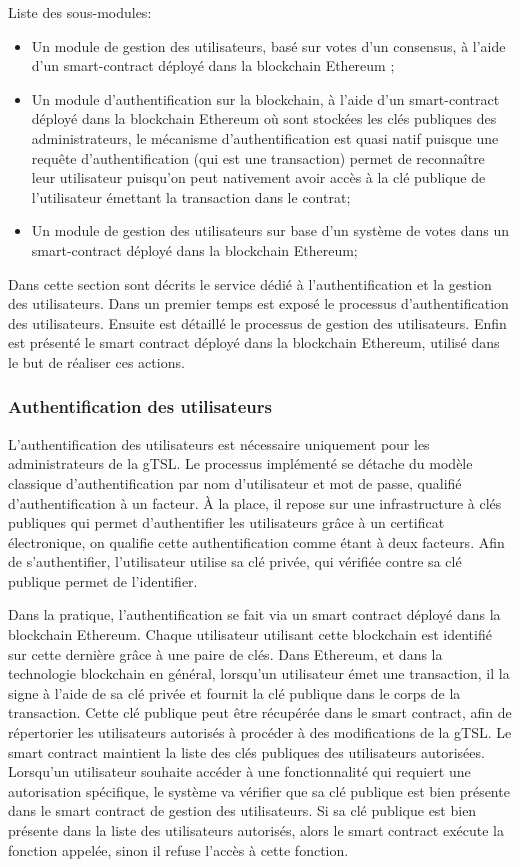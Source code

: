 \documentclass{tnreport}
\begin{document}
Liste des sous-modules:
\begin{itemize}
	\item Un module de gestion des utilisateurs, basé sur votes d’un consensus, à l’aide d’un smart-contract déployé dans la blockchain Ethereum ;
	\item Un module d'authentification sur la blockchain, à l’aide d’un smart-contract déployé dans la blockchain Ethereum où sont stockées les clés publiques des administrateurs, le mécanisme d'authentification est quasi natif puisque une requête d'authentification (qui est une transaction) permet de reconnaître leur utilisateur puisqu'on peut nativement avoir accès à la clé publique de l'utilisateur émettant la transaction dans le contrat;
	\item Un module de gestion des utilisateurs sur base d'un système de votes dans un smart-contract déployé dans la blockchain Ethereum;
\end{itemize}
\fi

Dans cette section sont décrits le service dédié à l'authentification et la gestion des utilisateurs. Dans un premier temps est exposé le processus d'authentification des utilisateurs. Ensuite est détaillé le processus de gestion des utilisateurs. Enfin est présenté le smart contract déployé dans la blockchain Ethereum, utilisé dans le but de réaliser ces actions.

\subsubsection{Authentification des utilisateurs}

L'authentification des utilisateurs est nécessaire uniquement pour les administrateurs de la gTSL. Le processus implémenté se détache du modèle classique d'authentification par nom d'utilisateur et mot de passe, qualifié d'authentification à un facteur. À la place, il repose sur une infrastructure à clés publiques qui permet d'authentifier les utilisateurs grâce à un certificat électronique, on qualifie cette authentification comme étant à deux facteurs. Afin de s'authentifier, l'utilisateur utilise sa clé privée, qui vérifiée contre sa clé publique permet de l'identifier.

Dans la pratique, l'authentification se fait via un smart contract déployé dans la blockchain Ethereum. Chaque utilisateur utilisant cette blockchain est identifié sur cette dernière grâce à une paire de clés.
Dans Ethereum, et dans la technologie blockchain en général, lorsqu'un utilisateur émet une transaction, il la signe à l'aide de sa clé privée et fournit la clé publique dans le corps de la transaction. Cette clé publique peut être récupérée dans le smart contract, afin de répertorier les utilisateurs autorisés à procéder à des modifications de la gTSL. 
Le smart contract maintient la liste des clés publiques des utilisateurs autorisées. 
Lorsqu'un utilisateur souhaite accéder à une fonctionnalité qui requiert une autorisation spécifique, le système va vérifier que sa clé publique est bien présente dans le smart contract de gestion des utilisateurs. Si sa clé publique est bien présente dans la liste des utilisateurs autorisés, alors le smart contract exécute la fonction appelée, sinon il refuse l'accès à cette fonction.
\end{document}
